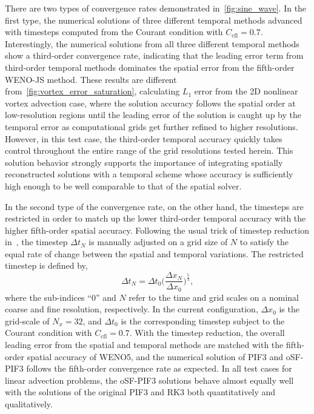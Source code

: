 There are two types of convergence rates demonstrated in~\cref{fig:sine_wave}.
In the first type, the numerical solutions of three different temporal methods
advanced with timesteps computed from the Courant condition with \( C_{\text{cfl}} = 0.7 \).
Interestingly, the numerical solutions from all three different temporal methods
show a third-order convergence rate, indicating that the leading error term from
third-order temporal methods dominates the spatial error from the fifth-order WENO-JS method.
These results are different from~\cref{fig:vortex_error_saturation},
calculating \( L_{1} \) error from the 2D nonlinear vortex advection case,
where the solution accuracy follows the spatial order at low-resolution regions
until the leading error of the solution is caught up by the temporal error
as computational grids get further refined to higher resolutions.
However, in this test case, the third-order temporal accuracy quickly takes control
throughout the entire range of the grid resolutions tested herein.
This solution behavior strongly supports the importance of
integrating spatially reconstructed solutions with a temporal scheme whose accuracy is
sufficiently high enough to be well comparable to that of the spatial solver.

In the second type of the convergence rate, on the other hand, the timesteps are restricted
in order to match up the lower third-order temporal accuracy with the higher fifth-order spatial accuracy.
Following the usual trick of timestep reduction in~\cite{mignone2010high},
the timestep \( \Delta t_{N} \) is manually adjusted on a grid size of \( N \)
to satisfy the equal rate of change between the spatial and temporal variations.
The restricted timestep is defined by,
\begin{equation}\label{eq:dt_reduction}
    {\Delta t_N} = {\Delta t_0} \Big( \frac{\Delta x_N}{\Delta x_0} \Big)^{\frac{5}{3}},
\end{equation}
where the sub-indices ``0'' and \( N \) refer to the time and grid scales
on a nominal coarse and fine resolution, respectively.
In the current configuration, \( \Delta x_{0} \) is the grid-scale of \( N_{x} = 32 \),
and \( \Delta t_{0} \) is the corresponding timestep subject to the Courant condition with \( C_{\text{cfl}} = 0.7 \).
With the timestep reduction, the overall leading error from the spatial and temporal methods
are matched with the fifth-order spatial accuracy of WENO5,
and the numerical solution of PIF3 and oSF-PIF3 follows the fifth-order convergence rate as expected.
In all test cases for linear advection problems, the oSF-PIF3 solutions behave
almost equally well with the solutions of the original PIF3 and RK3 both quantitatively and qualitatively.



